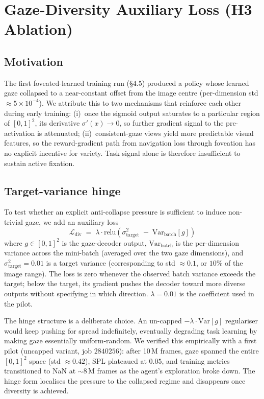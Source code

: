 \documentclass[10pt,conference,compsocconf]{IEEEtran}
\begin{document}



\appendices

\section{Gaze-Diversity Auxiliary Loss (H3 Ablation)}
\label{app:gaze_diversity}

\subsection*{Motivation}

The first foveated-learned training run (§4.5) produced a policy whose learned gaze collapsed to a near-constant offset from the image centre (per-dimension std $\approx 5\times 10^{-4}$). We attribute this to two mechanisms that reinforce each other during early training: (i)~once the sigmoid output saturates to a particular region of $[0,1]^2$, its derivative $\sigma'(x)\to 0$, so further gradient signal to the pre-activation is attenuated; (ii)~consistent-gaze views yield more predictable visual features, so the reward-gradient path from navigation loss through foveation has no explicit incentive for variety. Task signal alone is therefore insufficient to sustain active fixation.

\subsection*{Target-variance hinge}

To test whether an explicit anti-collapse pressure is sufficient to induce non-trivial gaze, we add an auxiliary loss
\[
\mathcal{L}_\text{div} \;=\; \lambda \cdot \text{relu}\!\left(\sigma^2_\text{target} \;-\; \text{Var}_\text{batch}[g]\right)
\]
where $g \in [0,1]^2$ is the gaze-decoder output, $\text{Var}_\text{batch}$ is the per-dimension variance across the mini-batch (averaged over the two gaze dimensions), and $\sigma^2_\text{target}=0.01$ is a target variance (corresponding to std $\approx 0.1$, or $10\%$ of the image range). The loss is zero whenever the observed batch variance exceeds the target; below the target, its gradient pushes the decoder toward more diverse outputs without specifying in which direction. $\lambda = 0.01$ is the coefficient used in the pilot.

The hinge structure is a deliberate choice. An un-capped $-\lambda \cdot \text{Var}[g]$ regulariser would keep pushing for spread indefinitely, eventually degrading task learning by making gaze essentially uniform-random. We verified this empirically with a first pilot (uncapped variant, job $2840256$): after 10\,M frames, gaze spanned the entire $[0,1]^2$ space (std $\approx 0.42$), SPL plateaued at $0.05$, and training metrics transitioned to NaN at $\sim 8$\,M frames as the agent's exploration broke down. The hinge form localises the pressure to the collapsed regime and disappears once diversity is achieved.
\end{document}
